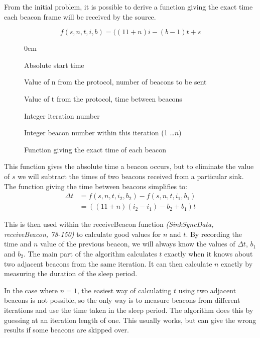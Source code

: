 \documentclass[a4paper,12pt,DIV=calc]{scrartcl}
\newcommand{\coderef}[3]{\emph{(#1, #2, #3)}}
\begin{document}
From the initial problem, it is possible to derive a function giving the exact
time each beacon frame will be received by the source.

\begin{figure}[ht]
  \begin{mdframed}
  \centering
    \begin{equation*}
      f(s, n, t, i, b) = ((11 + n)i - (b - 1)t + s
    \end{equation*}
    \begin{description}
      \itemsep0em
      \item[$s$] Absolute start time
      \item[$n$] Value of n from the protocol, number of beacons to be sent
      \item[$t$] Value of t from the protocol, time between beacons
      \item[$i$] Integer iteration number
      \item[$b$] Integer beacon number within this iteration (1 \dots $n$)
    \end{description}
  \end{mdframed}
  \caption{Function giving the exact time of each beacon}
\end{figure}

This function gives the absolute time a beacon occurs, but to eliminate the
value of $s$ we will subtract the times of two beacons received from a
particular sink. The function giving the time between beacons simplifies to:
\begin{align*}
  \Delta t &= f(s, n, t, i_2, b_2) - f(s, n, t, i_1, b_1) \\
           &= ((11 + n)(i_2 - i_1) - b_2 + b_1)t
\end{align*}

This is then used within the receiveBeacon function \coderef{SinkSyncData}
{receiveBeacon}{78-150} to calculate good values for $n$ and $t$. By recording
the time and $n$ value of the previous beacon, we will always know the values
of $\Delta t$, $b_1$ and $b_2$. The main part of the
algorithm calculates $t$ exactly when it knows about two adjacent beacons from
the same iteration. It can then calculate $n$ exactly by measuring the duration
of the sleep period.

In the case where $n = 1$, the easiest way of calculating $t$ using two adjacent
beacons is not possible, so the only way is to measure beacons from different
iterations and use the time taken in the sleep period. The algorithm does this
by guessing at an iteration length of one. This usually works, but can give the
wrong results if some beacons are skipped over.
\end{document}
